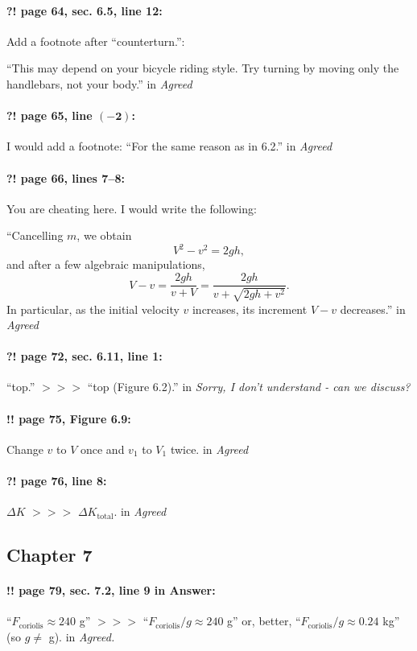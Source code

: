 \documentclass[twoside]{article}
\begin{document}
\paragraph{?! page 64, sec. 6.5, line 12:} Add a footnote after “counterturn.”:

“This may depend on your bicycle riding style. Try turning by moving only the handlebars, not your body.”
 in {\it  Agreed} 

\paragraph{?! page 65, line $\bm{(-2)}$:} I would add a footnote: “For the same reason as in 6.2.”
 in {\it  Agreed} 

\paragraph{?! page 66, lines 7--8:} You are cheating here. I would write the following:

“Cancelling $m$, we obtain
\[
V^2 - v^2 = 2gh,
\]
and after a few algebraic manipulations,
\[
V - v = \frac{2gh}{v + V} = \frac{2gh}{v + \sqrt{2gh + v^2}}.
\]
In particular, as the initial velocity $v$ increases, its increment $V - v$ decreases.”
 in {\it  Agreed} 

\paragraph{?! page 72, sec. 6.11, line 1:} “top.” $>\!>\!>$ “top (Figure 6.2).”
 in {\it  Sorry, I don't understand - can we discuss?} 

\paragraph{!! page 75, Figure 6.9:} Change $v$ to $V$ once and $v_1$ to $V_1$ twice.
 in {\it  Agreed} 

\paragraph{?! page 76, line 8:} $\Delta K$ $>\!>\!>$ $\Delta K_{\mathrm{total}}$.
 in {\it  Agreed} 

\subsection*{Chapter 7}

\paragraph{!! page 79, sec. 7.2, line 9 in Answer:}
“$F_{\mathrm{coriolis}}\approx 240$ g” $>\!>\!>$
“$F_{\mathrm{coriolis}}/g\approx 240$ g” or, better, “$F_{\mathrm{coriolis}}/g\approx 0.24$ kg” (so $g \ne$ g).
 in {\it  Agreed. } 
\end{document}
